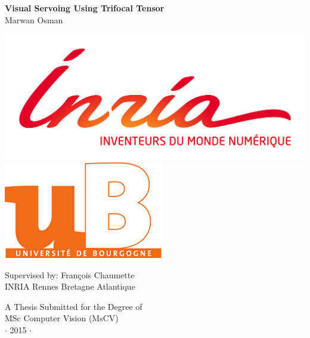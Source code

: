 \newpage
\thispagestyle{empty}


\vspace*{2cm}
\begin{center}
{\huge\bf Visual Servoing Using Trifocal Tensor\\} \vspace{2cm} {\large
Marwan Osman\\ }
\vspace{3cm}

\includegraphics[height=0.1\textheight]{figures/inrialogo.jpg}
\includegraphics[height=0.1\textheight]{figures/ublogo.png}

\vspace{1cm}
Supervised by: Fran\c{c}ois Chaumette\\
INRIA Rennes Bretagne Atlantique
\end{center}

\vspace{4cm}
\begin{center}
{\large A Thesis Submitted for the Degree of \\MSc Computer Vision (MsCV) \\\vspace{0.3cm} $\cdot$ 2015 $\cdot$}
\end{center}
\singlespacing
